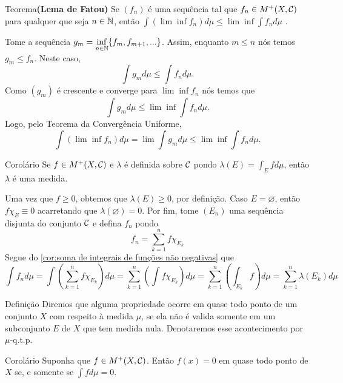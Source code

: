 \begin{env}{Teorema}\textbf{(Lema de Fatou)}
	\label{teo:lema de fatou}
	Se $(f_n)$ é uma sequência tal que $f_n \in M^+(X, \operatorname{\mathcal{C}})$ para qualquer que seja $n \in \operatorname{\mathbb{N}}$, então 
	$\displaystyle
	\int(\lim \inf f_n)d\mu \leq \lim \inf \int f_n d\mu$ \cite{bartle}. 
\end{env}
\begin{prova}
	Tome a sequência $g_m = \displaystyle \inf_{n \in \operatorname{\mathbb{N}}}\{f_m, f_{m+1},...\}$.
	Assim, enquanto $m\leq n$ nós temos $g_m \leq f_n$.
	Neste caso,
	$$
	\int g_m d\mu \leq \int f_n d\mu.
	$$
	Como $(g_m)$ é crescente e converge para $\lim\inf f_n$ nós temos que 
	$$
	\int g_m d\mu \leq \lim \inf \int f_n d\mu.
	$$
	Logo, pelo Teorema da Convergência Uniforme,
	$$
	\int (\lim \inf f_n)d\mu = \lim \int g_m d\mu \leq \lim \inf \int f_n d\mu.
	$$ 
\end{prova}
  
\begin{env}{Corolário}
	Se $f \in M^+(X, \operatorname{\mathcal{C}})$ e $\lambda$ é definida sobre $\operatorname{\mathcal{C}}$ pondo
	$
	\displaystyle\lambda(E) = \int_E fd\mu 
	$,
	então $\lambda$ é uma medida.
\end{env}

\begin{prova}
	Uma vez que $f \geq 0$, obtemos que $\lambda(E) \geq 0$, por definição.
	Caso $E = \varnothing$, então $f\chi_E \equiv 0$ acarretando que $\lambda(\varnothing) = 0$.
	Por fim, tome $(E_n)$ uma sequência disjunta do conjunto $\operatorname{\mathcal{C}}$ e defina
	$f_n$ pondo
	$$
	f_n = \sum_{k =1}^nf\chi_{E_k}
	$$
	Segue do \ref{cor:soma de integrais de funções não negativas} que
	$$
	\int f_n d\mu
	= \int \left(\sum_{k =1}^nf\chi_{E_k}\right) d\mu
	= \sum_{k =1}^n \left(\int f\chi_{E_k}\right) d\mu
	= \sum_{k =1}^n \left(\int_{E_k} f\right) d\mu
	= \sum_{k =1}^n \lambda(E_k) d\mu
	$$
\end{prova}


\begin{env}{Definição}
	\label{def:quase-todo-ponto}
	Diremos que alguma propriedade ocorre em quase todo ponto de um conjunto $X$ com respeito à medida $\mu$, se ela não é valida somente em um subconjunto $E$ de $X$ que tem medida nula.
	Denotaremos esse acontecimento por $\mu$-q.t.p.
\end{env}

\begin{env}{Corolário}
	Suponha que $f \in M^+(X, \operatorname{\mathcal{C}})$. Então
	$f(x) = 0$ em quase todo ponto de $X$ se, e somente se $\displaystyle \int fd\mu = 0$.
\end{env}

